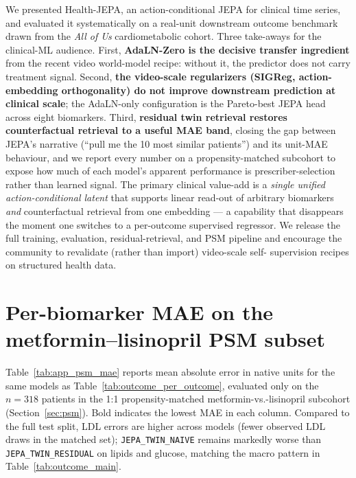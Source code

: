 We presented Health-JEPA, an action-conditional JEPA for clinical time
series, and evaluated it systematically on a real-unit downstream outcome
benchmark drawn from the \emph{All of Us} cardiometabolic cohort. Three
take-aways for the clinical-ML audience. First, \textbf{AdaLN-Zero is
the decisive transfer ingredient} from the recent video world-model
recipe: without it, the predictor does not carry treatment signal.
Second, \textbf{the video-scale regularizers (SIGReg, action-embedding
orthogonality) do not improve downstream prediction at clinical scale};
the AdaLN-only configuration is the Pareto-best JEPA head across eight
biomarkers. Third, \textbf{residual twin retrieval restores counterfactual
retrieval to a useful MAE band}, closing the gap between JEPA's narrative
(``pull me the 10 most similar patients'') and its unit-MAE behaviour,
and we report every number on a propensity-matched subcohort to expose
how much of each model's apparent performance is prescriber-selection
rather than learned signal. The primary clinical value-add is a
\emph{single unified action-conditional latent} that supports linear
read-out of arbitrary biomarkers \emph{and} counterfactual retrieval
from one embedding --- a capability that disappears the moment one
switches to a per-outcome supervised regressor. We release the full
training, evaluation, residual-retrieval, and PSM pipeline and encourage
the community to revalidate (rather than import) video-scale self-
supervision recipes on structured health data.

\FloatBarrier
\appendix

\section{Per-biomarker MAE on the metformin--lisinopril PSM subset}
\label{sec:appendix_psm}

Table~\ref{tab:app_psm_mae} reports mean absolute error in native units for
the same models as Table~\ref{tab:outcome_per_outcome}, evaluated only on
the $n{=}318$ patients in the 1:1 propensity-matched
metformin-vs.-lisinopril subcohort (Section~\ref{sec:psm}). Bold indicates
the lowest MAE in each column. Compared to the full test split, LDL errors
are higher across models (fewer observed LDL draws in the matched set);
\texttt{JEPA\_TWIN\_NAIVE} remains markedly worse than
\texttt{JEPA\_TWIN\_RESIDUAL} on lipids and glucose, matching the macro
pattern in Table~\ref{tab:outcome_main}.

